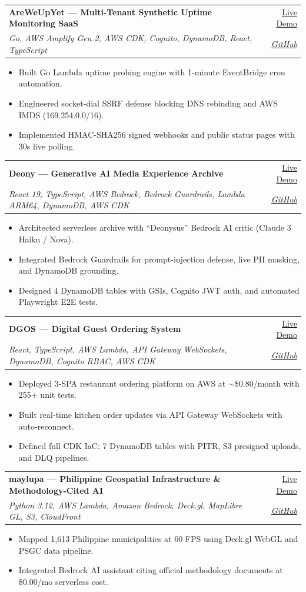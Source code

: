 \documentclass[letterpaper,10pt]{article}
\makeatletter
\newcommand{\resumeItem}[1]{
  \item\small{#1}
}
\newcommand{\resumeSubheading}[4]{
  \vspace{-2pt}\item
  \begin{tabular*}{0.97\textwidth}{l@{\extracolsep{\fill}}r}
    \textbf{#1} & #2\\
    \textit{#3} & \textit{#4}\\
  \end{tabular*}
  \vspace{-6pt}
}
\makeatother
\begin{document}
\resumeSubheading
{AreWeUpYet --- Multi-Tenant Synthetic Uptime Monitoring SaaS}{\href{https://main.d3pikhz9umtg2m.amplifyapp.com/}{Live Demo}}
{Go, AWS Amplify Gen 2, AWS CDK, Cognito, DynamoDB, React, TypeScript}{\href{https://github.com/pjpangilinan/areweupyet}{GitHub}}
\begin{itemize}[leftmargin=0.18in,itemsep=0.5pt]
\resumeItem{Built Go Lambda uptime probing engine with 1-minute EventBridge cron automation.}
\resumeItem{Engineered socket-dial SSRF defense blocking DNS rebinding and AWS IMDS (169.254.0.0/16).}
\resumeItem{Implemented HMAC-SHA256 signed webhooks and public status pages with 30s live polling.}
\end{itemize}

\resumeSubheading
{Deony --- Generative AI Media Experience Archive}{\href{https://d1cdomhzh1pe4j.cloudfront.net}{Live Demo}}
{React 19, TypeScript, AWS Bedrock, Bedrock Guardrails, Lambda ARM64, DynamoDB, AWS CDK}{\href{https://github.com/pjpangilinan/deony}{GitHub}}
\begin{itemize}[leftmargin=0.18in,itemsep=0.5pt]
\resumeItem{Architected serverless archive with ``Deonysus'' Bedrock AI critic (Claude 3 Haiku / Nova).}
\resumeItem{Integrated Bedrock Guardrails for prompt-injection defense, live PII masking, and DynamoDB grounding.}
\resumeItem{Designed 4 DynamoDB tables with GSIs, Cognito JWT auth, and automated Playwright E2E tests.}
\end{itemize}

\resumeSubheading
{DGOS --- Digital Guest Ordering System}{\href{https://dyk5iqkiyeb4c.cloudfront.net}{Live Demo}}
{React, TypeScript, AWS Lambda, API Gateway WebSockets, DynamoDB, Cognito RBAC, AWS CDK}{\href{https://github.com/pjpangilinan/dgos}{GitHub}}
\begin{itemize}[leftmargin=0.18in,itemsep=0.5pt]
\resumeItem{Deployed 3-SPA restaurant ordering platform on AWS at $\sim$\$0.80/month with 255+ unit tests.}
\resumeItem{Built real-time kitchen order updates via API Gateway WebSockets with auto-reconnect.}
\resumeItem{Defined full CDK IaC: 7 DynamoDB tables with PITR, S3 presigned uploads, and DLQ pipelines.}
\end{itemize}

\resumeSubheading
{maylupa --- Philippine Geospatial Infrastructure \& Methodology-Cited AI}{\href{https://d251rdq8bbiuc2.cloudfront.net}{Live Demo}}
{Python 3.12, AWS Lambda, Amazon Bedrock, Deck.gl, MapLibre GL, S3, CloudFront}{\href{https://github.com/pjpangilinan/maylupa}{GitHub}}
\begin{itemize}[leftmargin=0.18in,itemsep=0.5pt]
\resumeItem{Mapped 1,613 Philippine municipalities at 60 FPS using Deck.gl WebGL and PSGC data pipeline.}
\resumeItem{Integrated Bedrock AI assistant citing official methodology documents at \$0.00/mo serverless cost.}
\end{itemize}
\end{document}

